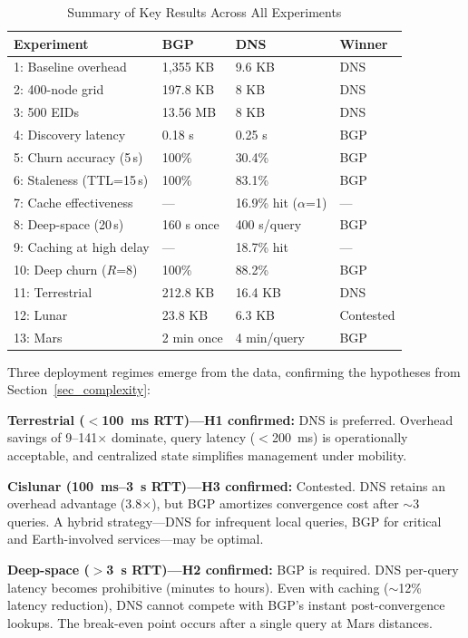 \documentclass[journal,twocolumn]{IEEEtran}
\begin{document}
\begin{table}[t]
\centering
\caption{Summary of Key Results Across All Experiments}
\label{tab:results_summary}
\begin{tabular}{@{}llll@{}}
\toprule
\textbf{Experiment} & \textbf{BGP} & \textbf{DNS} & \textbf{Winner} \\
\midrule
1: Baseline overhead & 1{,}355 KB & 9.6 KB & DNS \\
2: 400-node grid & 197.8 KB & 8 KB & DNS \\
3: 500 EIDs & 13.56 MB & 8 KB & DNS \\
4: Discovery latency & 0.18 s & 0.25 s & BGP \\
5: Churn accuracy (5\,s) & 100\% & 30.4\% & BGP \\
6: Staleness (TTL=15\,s) & 100\% & 83.1\% & BGP \\
7: Cache effectiveness & --- & 16.9\% hit ($\alpha$=1) & --- \\
8: Deep-space (20\,s) & 160 s once & 400 s/query & BGP \\
9: Caching at high delay & --- & 18.7\% hit & --- \\
10: Deep churn ($R$=8) & 100\% & 88.2\% & BGP \\
11: Terrestrial & 212.8 KB & 16.4 KB & DNS \\
12: Lunar & 23.8 KB & 6.3 KB & Contested \\
13: Mars & 2 min once & 4 min/query & BGP \\
\bottomrule
\end{tabular}
\end{table}

Three deployment regimes emerge from the data, confirming the hypotheses from Section~\ref{sec_complexity}:

\textbf{Terrestrial ($<$100~ms RTT)---H1 confirmed:} DNS is preferred. Overhead savings of 9--141$\times$ dominate, query latency ($<$200~ms) is operationally acceptable, and centralized state simplifies management under mobility.

\textbf{Cislunar (100~ms--3~s RTT)---H3 confirmed:} Contested. DNS retains an overhead advantage (3.8$\times$), but BGP amortizes convergence cost after $\sim$3 queries. A hybrid strategy---DNS for infrequent local queries, BGP for critical and Earth-involved services---may be optimal.

\textbf{Deep-space ($>$3~s RTT)---H2 confirmed:} BGP is required. DNS per-query latency becomes prohibitive (minutes to hours). Even with caching ($\sim$12\% latency reduction), DNS cannot compete with BGP's instant post-convergence lookups. The break-even point occurs after a single query at Mars distances.
\end{document}
